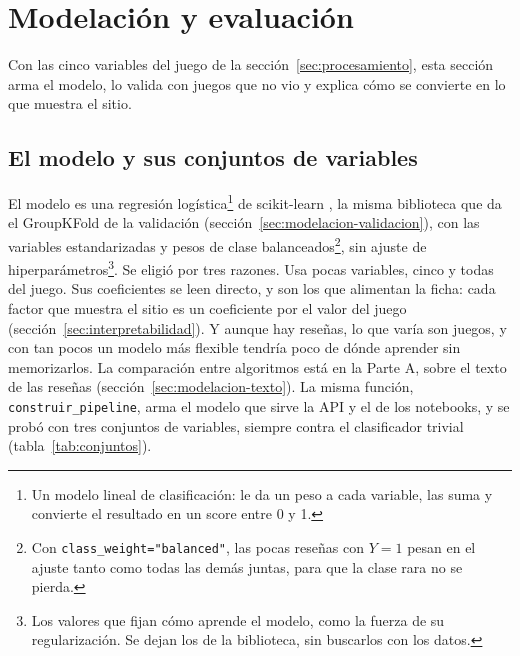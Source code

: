 \section{Modelación y evaluación}\label{sec:modelacion}

Con las cinco variables del juego de la sección~\ref{sec:procesamiento}, esta sección arma el
modelo, lo valida con juegos que no vio y explica cómo se convierte en lo que muestra el sitio.

\subsection{El modelo y sus conjuntos de variables}\label{sec:modelacion-conjuntos}

El modelo es una regresión logística\footnote{Un modelo lineal de clasificación: le da un peso a
cada variable, las suma y convierte el resultado en un score entre 0 y 1.} de scikit-learn
\parencite{pedregosa2011}, la misma biblioteca que da el GroupKFold de la validación
(sección~\ref{sec:modelacion-validacion}), con las variables
estandarizadas y pesos de clase balanceados\footnote{Con \texttt{class\_weight="balanced"}, las
pocas reseñas con $Y = 1$ pesan en el ajuste tanto como todas las demás juntas, para que la clase
rara no se pierda.}, sin ajuste de hiperparámetros\footnote{Los valores que fijan cómo aprende el modelo, como la
fuerza de su regularización. Se dejan los de la biblioteca, sin buscarlos con los datos.}. Se eligió por tres razones. Usa pocas
variables, cinco y todas del juego. Sus coeficientes se leen directo, y son los que alimentan la
ficha: cada factor que muestra el sitio es un coeficiente por el valor del juego
(sección~\ref{sec:interpretabilidad}). Y aunque hay \cifraResenasEntrenamiento{} reseñas, lo que
varía son \cifraJuegosEntrenamiento{} juegos, y con tan pocos un modelo más flexible tendría poco
de dónde aprender sin memorizarlos. La comparación entre algoritmos está en la Parte A, sobre el
texto de las reseñas (sección~\ref{sec:modelacion-texto}). La misma función,
\texttt{construir\_pipeline}, arma el modelo que sirve la API y el de los notebooks, y se probó con
tres conjuntos de variables, siempre contra el clasificador trivial (tabla~\ref{tab:conjuntos}).

